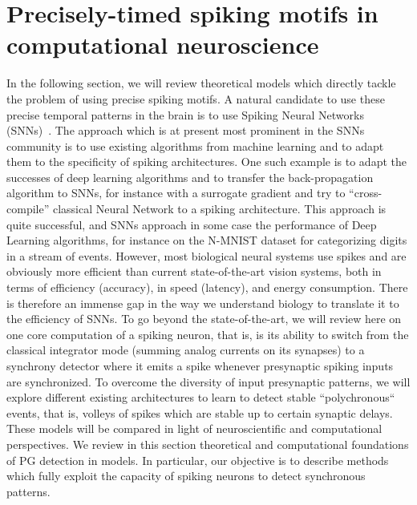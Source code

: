 \documentclass[brainsci, %
               review,submit,pdftex,moreauthors%
               ]{Definitions/mdpi}
\begin{document}
\section{Precisely-timed spiking motifs in computational neuroscience}
In the following section, we will review theoretical models which directly tackle the problem of using precise spiking motifs. 
A natural candidate to use these precise temporal patterns in the brain is to use Spiking Neural Networks (SNNs)~\citep{maass_networks_1997}. The approach which is at present most prominent in the SNNs community is to use existing algorithms from machine learning and to adapt them to the specificity of spiking architectures. One such example is to adapt the successes of deep learning algorithms and to transfer the back-propagation algorithm to SNNs, for instance with a surrogate gradient and try to ``cross-compile'' classical Neural Network to a spiking architecture. This approach is quite successful, and SNNs approach in some case the performance of Deep Learning algorithms, for instance on the N-MNIST dataset for categorizing digits in a stream of events. However, most biological neural systems use spikes and are obviously more efficient than current state-of-the-art vision systems, both in terms of efficiency (accuracy), in speed (latency), and energy consumption. There is therefore an immense gap in the way we understand biology to translate it to the efficiency of SNNs.  To go beyond the state-of-the-art, we will review here on one core computation of a spiking neuron, that is, is its ability to switch from the classical integrator mode (summing analog currents on its synapses) to a synchrony detector where it emits a spike whenever presynaptic spiking inputs are synchronized. To overcome the diversity of input presynaptic patterns, we will explore different existing architectures to learn to detect stable ``polychronous`` events, that is, volleys of spikes which are stable up to certain synaptic delays. These models will be compared in light of neuroscientific and computational perspectives. We review in this section theoretical and computational foundations of PG detection in models. In particular, our objective is to describe methods which fully exploit the capacity of spiking neurons to detect synchronous patterns.
\end{document}
